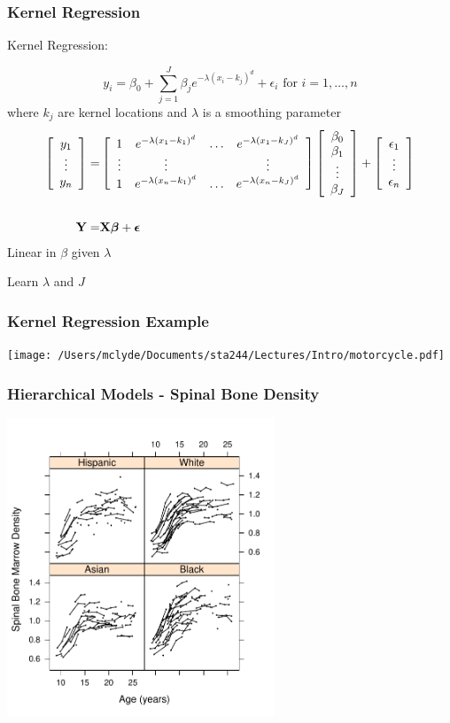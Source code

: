 \documentclass[]{beamer}
\begin{document}
\begin{frame} \frametitle{Kernel  Regression}
Kernel  Regression: 

$$y_i =  \beta_0 + \sum_{j = 1}^J \beta_j e^{-\lambda (x_i - k_j)^d} + \epsilon_i \text{  for  } i = 1, \ldots, n$$
where $k_j$ are kernel locations and $\lambda$ is a smoothing parameter
\pause
\begin{eqnarray*}
\left[
\begin{array}{c}  y_1 \\ \vdots \\  y_n \end{array} 
  \right]   =  & 
 \left[ \begin{array}{cccc}  1 &  e^{-\lambda (x_1 - k_1)^d} &
     \ldots &  e^{-\lambda (x_1 - k_J)^d}  \\
     \vdots & \vdots & & \vdots \\ 1 & e^{-\lambda (x_n - k_1)^d} &  \ldots & e^{-\lambda (x_n - k_J)^d} \end{array}  \right]   
 \left[ \begin{array}{c}  \beta_0  \\  \beta_1 \\\vdots \\ \beta_J \end{array}
 \right] + 
\left[ \begin{array}{c}  \epsilon_1 \\ \vdots \\ \epsilon_n  \end{array}
\right] \\
 & \\ 
\mathbf{Y} = & \mathbf{X} \boldsymbol{\beta} + \boldsymbol{\epsilon}
\end{eqnarray*} \pause
Linear in $\beta$ given $\lambda$ \\  \pause
 
Learn $\lambda$  and $J$


\end{frame}

\begin{frame}
  \frametitle{Kernel Regression Example}
  \texttt{[image: /Users/mclyde/Documents/sta244/Lectures/Intro/motorcycle.pdf]}
\end{frame}
\begin{frame}
  \frametitle{Hierarchical Models - Spinal Bone Density}
\centerline{  \includegraphics[height=3.5in]{spinalbone}}
\end{frame}
\end{document}
